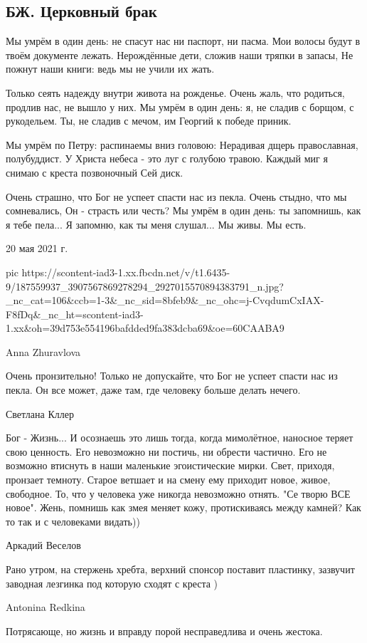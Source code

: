  
 
 
 
 
\subsection{БЖ. Церковный брак}

Мы умрём в один день: не спасут нас ни паспорт, ни пасма.
Мои волосы будут в твоём документе лежать.
Нерождённые дети, сложив наши тряпки в запасы,
Не пожнут наши книги: ведь мы не учили их жать.

Только сеять надежду внутри живота на рожденье.
Очень жаль, что родиться, продлив нас, не вышло у них.
Мы умрём в один день: я, не сладив с борщом, с рукодельем.
Ты, не сладив с мечом, им Георгий к победе приник.

Мы умрём по Петру: распинаемы вниз головою:
Нерадивая дщерь православная, полубуддист.
У Христа небеса - это луг с голубою травою.
Каждый миг я снимаю с креста позвоночный Сей диск.

Очень страшно, что Бог не успеет спасти нас из пекла.
Очень стыдно, что мы сомневались, Он - страсть или честь?
Мы умрём в один день: ты запомнишь, как я тебе пела...
Я запомню, как ты меня слушал... Мы живы. Мы есть.

20 мая 2021 г.

\ifcmt
  pic https://scontent-iad3-1.xx.fbcdn.net/v/t1.6435-9/187559937_3907567869278294_2927015570894383791_n.jpg?_nc_cat=106&ccb=1-3&_nc_sid=8bfeb9&_nc_ohc=j-CvqdumCxIAX-F8fDq&_nc_ht=scontent-iad3-1.xx&oh=39d753e554196bafdded9fa383dcba69&oe=60CAABA9
\fi

Anna Zhuravlova

Очень пронзительно! Только не допускайте, что Бог не успеет спасти нас из
пекла. Он все может, даже там, где человеку больше делать нечего.

Светлана Кллер

Бог - Жизнь... И осознаешь это лишь тогда, когда мимолётное, наносное теряет
свою ценность. Его невозможно ни постичь, ни обрести частично. Его не возможно
втиснуть в наши маленькие эгоистические мирки. Свет, приходя, пронзает темноту.
Старое ветшает и на смену ему приходит новое, живое, свободное. То, что у
человека уже никогда невозможно отнять. "Се творю ВСЕ новое". Жень, помнишь как
змея меняет кожу, протискиваясь между камней? Как то так и с человеками
видать))

Аркадий Веселов

Рано утром, на стержень хребта, верхний спонсор поставит пластинку, зазвучит
заводная лезгинка под которую сходят с креста )

Antonina Redkina

Потрясающе, но жизнь и вправду порой несправедлива и очень жестока.

